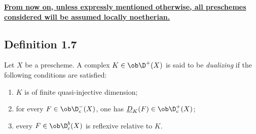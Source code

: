 \textbf{\uline{From now on, unless expressly mentioned otherwise, all preschemes considered will be assumed locally noetherian.}}

\subsection*{Definition 1.7}
Let $X$ be a prescheme. A complex $K \in \ob \D^{+}(X)$ is said to be \emph{dualizing} if the following conditions are satisfied:
\begin{enumerate}[label=(\roman*)]
\item $K$ is of finite quasi-injective dimension;
\item for every $F \in \ob \D_c^{-}(X)$, one has $\underline{D}_K(F) \in \ob \D_c^{+}(X)$;
\item every $F \in \ob \D_c^{b}(X)$ is reflexive relative to $K$.
\end{enumerate}

